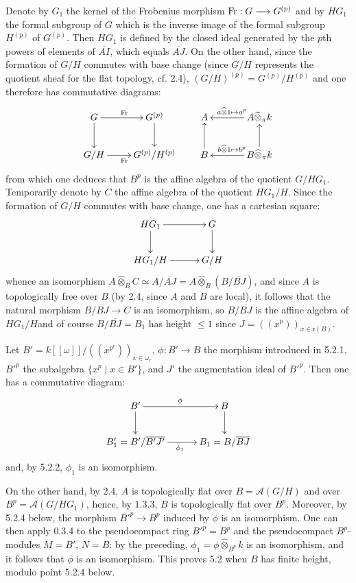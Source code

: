 Denote by $G_1$ the kernel of the Frobenius morphism $\operatorname{Fr}:G\longrightarrow G^{(p)}$ and by $HG_1$ the formal subgroup of $G$ which is the inverse image of the formal subgroup $H^{(p)}$ of $G^{(p)}$. Then $HG_1$ is defined by the closed ideal generated by the $p$th powers of elements of $\overline{AI}$, which equals $\overline{AJ}$. On the other hand, since the formation of $G/H$ commutes with base change (since $G/H$ represents the quotient sheaf for the flat topology, cf. 2.4), $(G/H)^{(p)}=G^{(p)}/H^{(p)}$ and one therefore has commutative diagrams:
\[
\xymatrix@C=24pt@R=23pt{
G\ar[r]^{\Fr}\ar[d]&G^{(p)}\ar[d]\\
G/H\ar[r]_{\Fr}&G^{(p)}/H^{(p)}}
\qquad
\xymatrix@C=34pt@R=23pt{
A&A\widehat\otimes_\pi k\ar[l]_{a\widehat\otimes1\mapsto a^p}\\
B\ar[u]&B\widehat\otimes_\pi k\ar[u]\ar[l]_{b\widehat\otimes1\mapsto b^p}}
\]
from which one deduces that $B^p$ is the affine algebra of the quotient $G/HG_1$. Temporarily denote by $C$ the affine algebra of the quotient $HG_1/H$. Since the formation of $G/H$ commutes with base change, one has a cartesian square:
\[
\xymatrix@C=30pt@R=22pt{HG_1\ar[r]\ar[d]&G\ar[d]\\HG_1/H\ar[r]&G/H}
\]
whence an isomorphism $A\widehat\otimes_B C\simeq A/\overline{AJ}=A\widehat\otimes_B(B/\overline{BJ})$, and since $A$ is topologically free over $B$ (by 2.4, since $A$ and $B$ are local), it follows that the natural morphism $B/\overline{BJ}\to C$ is an isomorphism, so $B/\overline{BJ}$ is the affine algebra of $HG_1/H$\footnotemark[159] and of course $B/\overline{BJ}=B_1$ has height $\le1$ since $J=((x^p))_{x\in\mathfrak r(B)}$.

Let $B'=k[[\omega]]/((x^{p^r}))_{x\in\omega_r}$, $\phi:B'\to B$ the morphism introduced in 5.2.1, $B'^p$ the subalgebra $\{x^p\mid x\in B'\}$, and $J'$ the augmentation ideal of $B'^p$. Then one has a commutative diagram:
\[
\xymatrix@C=30pt@R=22pt{B'\ar[r]^\phi\ar[d]&B\ar[d]\\B_1'=B'/\overline{B'J'}\ar[r]_{\phi_1}&B_1=B/\overline{BJ}}
\]
and, by 5.2.2, $\phi_1$ is an isomorphism.

On the other hand, by 2.4, $A$ is topologically flat over $B=\mathscr A(G/H)$ and over $B^p=\mathscr A(G/HG_1)$, hence, by 1.3.3, $B$ is topologically flat over $B^p$. Moreover, by 5.2.4 below, the morphism $B'^p\to B^p$ induced by $\phi$ is an isomorphism. One can then apply 0.3.4 to the pseudocompact ring $B'^p=B^p$ and the pseudocompact $B^p$-modules $M=B'$, $N=B$: by the preceding, $\phi_1=\phi\widehat\otimes_{B^p}k$ is an isomorphism, and it follows that $\phi$ is an isomorphism. This proves 5.2 when $B$ has finite height, modulo point 5.2.4 below.

